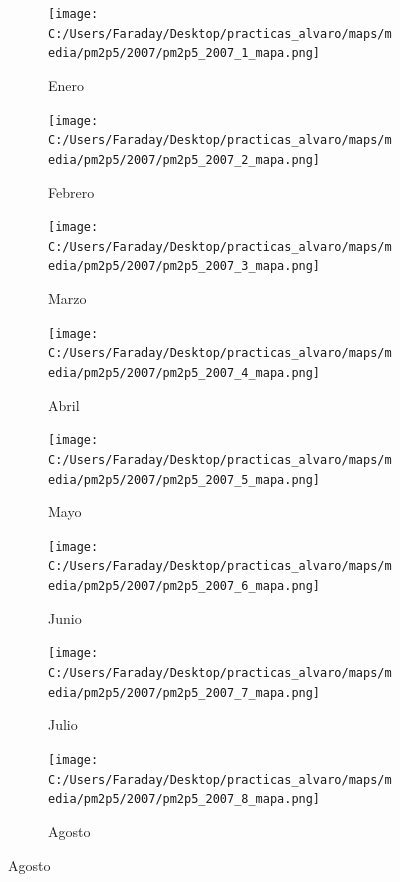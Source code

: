 \documentclass[12pt]{beamer}
\begin{document}
\begin{frame}[squeeze]
\tiny
\begin{figure}[H]
\centering
\begin{subfigure}[H]{0.20\textwidth}
\texttt{[image: C:/Users/Faraday/Desktop/practicas\_alvaro/maps/media/pm2p5/2007/pm2p5\_2007\_1\_mapa.png]}
\captionsetup{labelformat=empty}
\caption{\scriptsize Enero}
\label{fig:map-pm2p5-2007-1}
\end{subfigure}
%
\begin{subfigure}[H]{0.20\textwidth}
\texttt{[image: C:/Users/Faraday/Desktop/practicas\_alvaro/maps/media/pm2p5/2007/pm2p5\_2007\_2\_mapa.png]}
\captionsetup{labelformat=empty}
\caption{\scriptsize Febrero}
\label{fig:map-pm2p5-2007-2}
\end{subfigure}
%
\begin{subfigure}[H]{0.20\textwidth}
\texttt{[image: C:/Users/Faraday/Desktop/practicas\_alvaro/maps/media/pm2p5/2007/pm2p5\_2007\_3\_mapa.png]}
\captionsetup{labelformat=empty}
\caption{\scriptsize Marzo}
\label{fig:map-pm2p5-2007-3}
\end{subfigure}
%
\begin{subfigure}[H]{0.20\textwidth}
\texttt{[image: C:/Users/Faraday/Desktop/practicas\_alvaro/maps/media/pm2p5/2007/pm2p5\_2007\_4\_mapa.png]}
\captionsetup{labelformat=empty}
\caption{\scriptsize Abril}
\label{fig:map-pm2p5-2007-4}
\end{subfigure}

\begin{subfigure}[H]{0.20\textwidth}
\texttt{[image: C:/Users/Faraday/Desktop/practicas\_alvaro/maps/media/pm2p5/2007/pm2p5\_2007\_5\_mapa.png]}
\captionsetup{labelformat=empty}
\caption{\scriptsize Mayo}
\label{fig:map-pm2p5-2007-5}
\end{subfigure}
%
\begin{subfigure}[H]{0.20\textwidth}
\texttt{[image: C:/Users/Faraday/Desktop/practicas\_alvaro/maps/media/pm2p5/2007/pm2p5\_2007\_6\_mapa.png]}
\captionsetup{labelformat=empty}
\caption{\scriptsize Junio}
\label{fig:map-pm2p5-2007-6}
\end{subfigure}
%
\begin{subfigure}[H]{0.20\textwidth}
\texttt{[image: C:/Users/Faraday/Desktop/practicas\_alvaro/maps/media/pm2p5/2007/pm2p5\_2007\_7\_mapa.png]}
\captionsetup{labelformat=empty}
\caption{\scriptsize Julio}
\label{fig:map-pm2p5-2007-7}
\end{subfigure}
%
\begin{subfigure}[H]{0.20\textwidth}
\texttt{[image: C:/Users/Faraday/Desktop/practicas\_alvaro/maps/media/pm2p5/2007/pm2p5\_2007\_8\_mapa.png]}
\captionsetup{labelformat=empty}
\caption{\scriptsize Agosto}
\label{fig:map-pm2p5-2007-8}
\end{subfigure}


\end{figure}
\end{frame}
\end{document}
